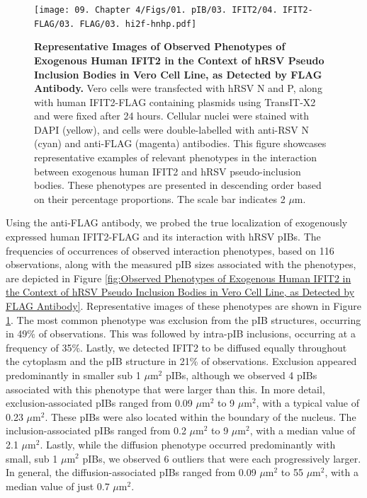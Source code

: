 \begin{figure}
    \centering
    \texttt{[image: 09. Chapter 4/Figs/01. pIB/03. IFIT2/04. IFIT2-FLAG/03. FLAG/03. hi2f-hnhp.pdf]}
    \caption[Representative Images of Observed Phenotypes of Exogenous Human IFIT2 in the Context of hRSV Pseudo Inclusion Bodies in Vero Cell Line, as Detected by FLAG Antibody.]{\textbf{Representative Images of Observed Phenotypes of Exogenous Human IFIT2 in the Context of hRSV Pseudo Inclusion Bodies in Vero Cell Line, as Detected by FLAG Antibody.} Vero cells were transfected with hRSV N and P, along with human IFIT2-FLAG containing plasmids using TransIT-X2 and were fixed after 24 hours. Cellular nuclei were stained with DAPI (yellow), and cells were double-labelled with anti-RSV N (cyan) and anti-FLAG (magenta) antibodies. This figure showcases representative examples of relevant phenotypes in the interaction between exogenous human IFIT2 and hRSV pseudo-inclusion bodies. These phenotypes are presented in descending order based on their percentage proportions. The scale bar indicates 2 \(\mu \mbox{m}\).}
    \label{fig:Representative Images of Observed Phenotypes of Exogenous Human IFIT2 in the Context of hRSV Pseudo Inclusion Bodies in Vero Cell Line, as Detected by FLAG Antibody}
\end{figure}

Using the anti-FLAG antibody, we probed the true localization of exogenously expressed human IFIT2-FLAG and its interaction with hRSV pIBs. The frequencies of occurrences of observed interaction phenotypes, based on 116 observations, along with the measured pIB sizes associated with the phenotypes, are depicted in Figure \ref{fig:Observed Phenotypes of Exogenous Human IFIT2 in the Context of hRSV Pseudo Inclusion Bodies in Vero Cell Line, as Detected by FLAG Antibody}. Representative images of these phenotypes are shown in Figure \ref{fig:Representative Images of Observed Phenotypes of Exogenous Human IFIT2 in the Context of hRSV Pseudo Inclusion Bodies in Vero Cell Line, as Detected by FLAG Antibody}. The most common phenotype was exclusion from the pIB structures, occurring in 49\% of observations. This was followed by intra-pIB inclusions, occurring at a frequency of 35\%. Lastly, we detected IFIT2 to be diffused equally throughout the cytoplasm and the pIB structure in 21\% of observations. Exclusion appeared predominantly in smaller sub 1 \(\mu \mbox{m}^2\) pIBs, although we observed 4 pIBs associated with this phenotype that were larger than this. In more detail, exclusion-associated pIBs ranged from 0.09 \(\mu \mbox{m}^2\) to 9 \(\mu \mbox{m}^2\), with a typical value of 0.23 \(\mu \mbox{m}^2\). These pIBs were also located within the boundary of the nucleus. The inclusion-associated pIBs ranged from 0.2 \(\mu \mbox{m}^2\) to 9 \(\mu \mbox{m}^2\), with a median value of 2.1 \(\mu \mbox{m}^2\). Lastly, while the diffusion phenotype occurred predominantly with small, sub 1 \(\mu \mbox{m}^2\) pIBs, we observed 6 outliers that were each progressively larger. In general, the diffusion-associated pIBs ranged from 0.09 \(\mu \mbox{m}^2\) to 55 \(\mu \mbox{m}^2\), with a median value of just 0.7 \(\mu \mbox{m}^2\).

